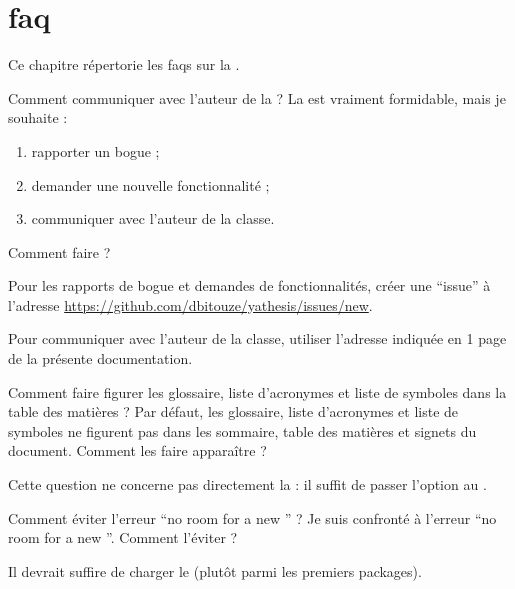 \chapter{\texorpdfstring{\gls{faq}}{FAQ}}\label{cha:faq}

Ce chapitre répertorie les \glspl{faq} sur la \yatcl{}.

\begin{dbfaq}{Comment communiquer avec l'auteur de la \yatcl{} ?}{}
  La \yatcl{} est vraiment formidable, mais je souhaite :
  \begin{enumerate}
  \item rapporter un bogue ;
  \item demander une nouvelle fonctionnalité ;
  \item communiquer avec l'auteur de la classe.
  \end{enumerate}
  Comment faire ?
\end{dbfaq}
  \begin{dbanswer}{}{}
    Pour les rapports de bogue et demandes de fonctionnalités, créer une
    \enquote{issue} à l'adresse
    \url{https://github.com/dbitouze/yathesis/issues/new}.

    Pour communiquer avec l'auteur de la classe, utiliser l'adresse indiquée en
    1\iere{} page de la présente documentation.
  \end{dbanswer}

\begin{dbfaq}{Comment faire figurer les glossaire, liste d'acronymes et liste
    de symboles dans la table des matières ?}{}
  Par défaut, les glossaire, liste d'acronymes et liste de symboles ne figurent
  pas dans les sommaire, table des matières et signets du document. Comment les
  faire apparaître ?
\end{dbfaq}
  \begin{dbanswer}{}{}
    Cette question ne concerne pas directement la \yatcl{} : il suffit de
    passer l'option  au .
  \end{dbanswer}

\begin{dbfaq}{Comment éviter l'erreur \enquote{no room for a new
      \protect{}} ?}{}
  Je suis confronté à l'erreur \enquote{no room for a new
    }. Comment l'éviter ?
\end{dbfaq}
\begin{dbanswer}{}{}
  Il devrait suffire de charger le  (plutôt parmi les
  premiers packages).
\end{dbanswer}

%
\iffalse
\fi

